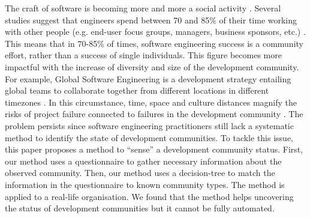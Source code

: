 \documentclass[conference]{IEEEtran}
\begin{document}
The craft of software is becoming more and more a social activity \cite{specissue}. Several studies suggest that engineers spend between 70 and 85\% of their time working with other people (e.g. end-user focus groups, managers, business sponsors, etc.) \cite{socialbook}. This means that in 70-85\% of times, software engineering success is a community effort, rather than a success of single individuals. This figure becomes more impactful with the increase of diversity and size of the development community. For example, Global Software Engineering is a development strategy entailing global teams to collaborate together from different locations in different timezones \cite{gsdbook}. In this circumstance, time, space and culture distances magnify the risks of project failure connected to failures in the development community \cite{empirglob,nachiappan,icgseoss}.
The problem persists since software engineering practitioners still lack a systematic method to identify the state of development communities. 
To tackle this issue, this paper proposes a method to ``sense'' a development community status. First, our method uses a questionnaire to gather necessary information about the observed community. Then, our method uses a decision-tree to match the information in the questionnaire to known community types. The method is applied to a real-life organisation. We found that the method helps uncovering the status of development communities but it cannot be fully automated.


%
\end{document}
